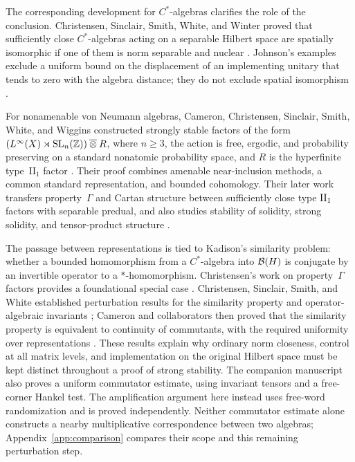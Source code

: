 The corresponding development for $C^*$-algebras clarifies the role of the
conclusion. Christensen, Sinclair, Smith, White, and Winter proved that
sufficiently close $C^*$-algebras acting on a separable Hilbert space
are spatially isomorphic if one of them is norm separable and nuclear
\cite{CSSWW2010,CSSWW2012}.
Johnson's examples exclude a uniform bound on the displacement of an
implementing unitary that tends to zero with the algebra distance;
they do not exclude spatial isomorphism \cite{Johnson1982}.

For nonamenable von Neumann algebras, Cameron, Christensen, Sinclair, Smith,
White, and Wiggins constructed strongly stable factors of the form
$(L^\infty(X)\rtimes\mathrm{SL}_n(\mathbb Z))\mathbin{\overline\otimes} R$, where
$n\geq3$, the action is free, ergodic, and probability preserving on a
standard nonatomic probability space, and $R$ is the hyperfinite
type~$\mathrm{II}_1$ factor \cite{CCSSWW2012,CCSSWW2014}.
Their proof combines amenable near-inclusion methods, a common standard
representation, and bounded cohomology. Their later work transfers
property~$\Gamma$ and Cartan structure between sufficiently close type
$\mathrm{II}_1$ factors with separable predual, and also studies stability of
solidity, strong solidity, and tensor-product structure
\cite{CCSSWW2017}.

The passage between representations is tied to Kadison's similarity
problem: whether a bounded homomorphism from a $C^*$-algebra into
$\mathcal B(H)$ is conjugate by an invertible operator to a $*$-homomorphism.
Christensen's work on property~$\Gamma$ factors provides a
foundational special case \cite{Christensen1986,Christensen2001}.
Christensen, Sinclair, Smith, and White established perturbation results
for the similarity property and operator-algebraic invariants
\cite{CSSW2010}; Cameron and collaborators then proved that the similarity
property is equivalent to continuity of commutants, with the required
uniformity over representations \cite{CCSSWW2013}.
These results explain why ordinary norm closeness, control at all matrix
levels, and implementation on the original Hilbert space must be kept
distinct throughout a proof of strong stability.
The companion manuscript \cite{OpenAI2026Similarity} also proves a
uniform commutator estimate, using invariant tensors and a free-corner
Hankel test. The amplification argument here instead uses free-word
randomization and is proved independently. Neither commutator estimate
alone constructs a nearby multiplicative correspondence between two
algebras; Appendix~\ref{app:comparison} compares their scope and this
remaining perturbation step.

